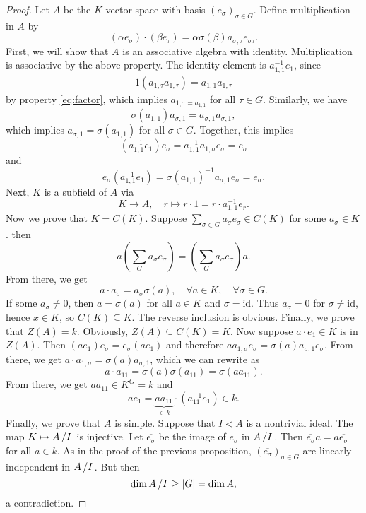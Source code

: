 \documentclass[10pt, a4paper]{article}
\newenvironment{noticeC}{%
  \tcolorbox[%
  notitle,
  empty,
  enhanced,  %
  breakable,
  coltext=black, 
  fontupper=\rmfamily,
  noparskip,
  sharp corners,
  boxrule=-1pt,  %
  frame hidden,
  left=7pt,  %
  right=7pt,
  top=5pt,
  bottom=5pt,
  before skip=2.5ex plus 2pt,
  after skip=2.5ex plus 2pt,
  overlay unbroken and last={%
  },
  ]}
{\endtcolorbox}
\newenvironment{myproof}%
  {\begin{noticeC}\begin{proof}}%
  {\end{proof}\end{noticeC}}
\newcommand{\quot}[2]{{\raisebox{0em}{$#1$}\left/\raisebox{0em}{$#2$}\right.}}
\begin{document}
\begin{myproof}
  Let $A$ be the $K$-vector space with basis $(e_\sigma)_{\sigma \in G}$.
  Define multiplication in $A$ by 
  $$(\alpha e_\sigma) \cdot (\beta e_\tau) = \alpha \sigma (\beta) a_{\sigma, \tau} e_{\sigma \tau}.$$
  First, we will show that $A$ is an associative algebra with identity.
  Multiplication is associative by the above property. The identity element is $a_{1, 1} ^{-1} e_1$, since 
  \begin{align*}
    1 (a_{1, \tau} a_{1, \tau}) = a_{1, 1} a_{1, \tau}
  \end{align*} by property \eqref{eq:factor}, which implies $a_{1, \tau = a_{1, 1}}$ for all $\tau \in G$.
  Similarly, we have 
  $$\sigma (a_{1, 1}) a_{\sigma, 1} = a_{\sigma, 1} a_{\sigma, 1},$$
  which implies $a_{\sigma, 1} = \sigma(a_{1, 1})$ for all $\sigma \in G$. Together, this implies 
  $$(a_{1, 1}^{-1} e_1) e_{\sigma} = a_{1, 1}^{-1} a_{1, \sigma} e_\sigma = e_\sigma$$ and 
  $$e_\sigma (a_{1, 1}^{-1} e_1) = \sigma(a_{1, 1})^{-1} a_{\sigma, 1} e_\sigma = e_\sigma.$$
  Next, $K$ is a subfield of $A$ via 
  $$K \to A,\quad r \mapsto r \cdot 1 = r \cdot a_{1, 1} ^{-1} e_r.$$
  Now we prove that $K = C(K)$. Suppose $\sum_{\sigma \in G} a_{\sigma} e_\sigma \in C(K)$ for some $a_\sigma \in K$.
  then 
  $$a \left(\sum_G a_\sigma e_\sigma\right) = \left(\sum_G a_\sigma e_\sigma\right) a.$$
  From there, we get 
  $$a \cdot a_\sigma = a_\sigma \sigma(a),\quad \forall a \in K,\quad \forall \sigma \in G.$$
  If some $a_\sigma \neq 0$, then $a = \sigma (a)$ for all $a \in K$ and $\sigma = \mathrm{id}$.
  Thus $a_\sigma = 0$ for $\sigma \neq \mathrm{id}$, hence $x \in K$,
  so $C(K) \subseteq K$. The reverse inclusion is obvious.
  Finally, we prove that $Z(A) = k$. Obviously, $Z(A) \subseteq C(K) = K$.
  Now suppose $a \cdot e_1 \in K$ is in $Z(A)$. Then $(a e_1) e_\sigma = e_\sigma (a e_1)$ and therefore $a a_{1, \sigma} e_\sigma = \sigma(a) a_{\sigma, 1} e_\sigma$.
  From there, we get $a \cdot a_{1, \sigma} = \sigma(a) a_{\sigma, 1}$, which we can rewrite as 
  $$a \cdot a_{11} = \sigma(a) \sigma(a_{11}) = \sigma(a a_{11}).$$ From there, we get $a a_{11} \in K^G = k$ and 
  $$a e_1 = \underbrace{a a_{11}}_{\in k} \cdot (a_{11} ^{-1} e_1) \in k.$$
  Finally, we prove that $A$ is simple. Suppose that $I \lhd A$ is a nontrivial ideal.
  The map $K \mapsto \quot{A}{I}$ is injective. Let $\overline{e_\sigma}$ be the image of $e_{\sigma}$ in $\quot{A}{I}$.
  Then $\overline{e_\sigma} a = a \overline{e_\sigma}$ for all $a \in k$.
  As in the proof of the previous proposition, $(\overline{e_\sigma})_{\sigma \in G}$ are linearly independent in $\quot{A}{I}$.
  But then $$\dim \quot{A}{I} \geq |G| = \dim A,$$ a contradiction.
\end{myproof}
\end{document}
